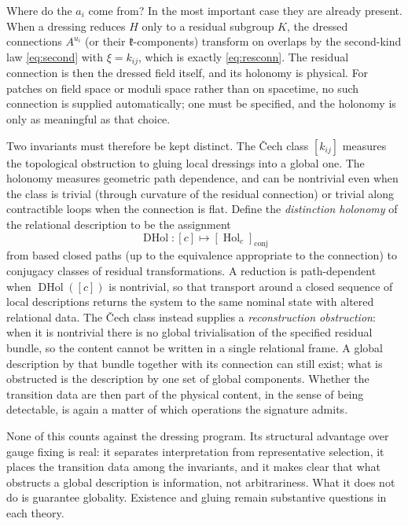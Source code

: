 \documentclass[11pt]{article}
\theoremstyle{plain}
\theoremstyle{definition}
\theoremstyle{remark}
\newcommand{\Hol}{\operatorname{Hol}}
\begin{document}
Where do the $a_i$ come from? In the most important case they are already present. When a dressing reduces $H$ only to a residual subgroup $K$, the dressed connections $A^{u_i}$ (or their $\mathfrak k$-components) transform on overlaps by the second-kind law \eqref{eq:second} with $\xi=k_{ij}$, which is exactly \eqref{eq:resconn}. The residual connection is then the dressed field itself, and its holonomy is physical. For patches on field space or moduli space rather than on spacetime, no such connection is supplied automatically; one must be specified, and the holonomy is only as meaningful as that choice.

Two invariants must therefore be kept distinct. The Čech class $[k_{ij}]$ measures the topological obstruction to gluing local dressings into a global one. The holonomy measures geometric path dependence, and can be nontrivial even when the class is trivial (through curvature of the residual connection) or trivial along contractible loops when the connection is flat. Define the \emph{distinction holonomy} of the relational description to be the assignment
\begin{equation}\label{eq:disthol}
\operatorname{DHol}:[c]\longmapsto[\Hol_c]_{\mathrm{conj}}
\end{equation}
from based closed paths (up to the equivalence appropriate to the connection) to conjugacy classes of residual transformations. A reduction is path-dependent when $\operatorname{DHol}([c])$ is nontrivial, so that transport around a closed sequence of local descriptions returns the system to the same nominal state with altered relational data. The Čech class instead supplies a \emph{reconstruction obstruction}: when it is nontrivial there is no global trivialisation of the specified residual bundle, so the content cannot be written in a single relational frame. A global description by that bundle together with its connection can still exist; what is obstructed is the description by one set of global components. Whether the transition data are then part of the physical content, in the sense of being detectable, is again a matter of which operations the signature admits.

None of this counts against the dressing program. Its structural advantage over gauge fixing is real: it separates interpretation from representative selection, it places the transition data among the invariants, and it makes clear that what obstructs a global description is information, not arbitrariness. What it does not do is guarantee globality. Existence and gluing remain substantive questions in each theory.
\end{document}
